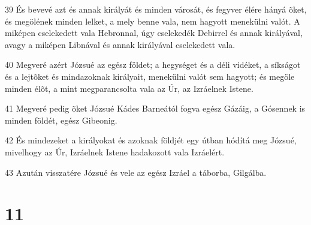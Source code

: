 \par 39 És bevevé azt és annak királyát és minden városát, és fegyver élére hányá õket, és megölének minden lelket, a mely benne vala, nem hagyott menekülni valót. A miképen cselekedett vala Hebronnal, úgy cselekedék Debirrel és annak királyával, avagy a miképen Libnával és annak királyával cselekedett vala.
\par 40 Megveré azért Józsué az egész földet; a hegységet és a déli vidéket, a síkságot és a lejtõket és mindazoknak királyait, menekülni valót sem hagyott; és megöle minden élõt, a mint megparancsolta  vala az Úr, az Izráelnek Istene.
\par 41 Megveré pedig õket Józsué Kádes Barneától fogva egész Gázáig, a Gósennek is minden földét, egész Gibeonig.
\par 42 És mindezeket a királyokat és azoknak földjét egy útban hódítá meg Józsué, mivelhogy az Úr, Izráelnek Istene hadakozott vala Izráelért.
\par 43 Azután visszatére Józsué és vele az egész Izráel a táborba, Gilgálba.

\chapter{11}

